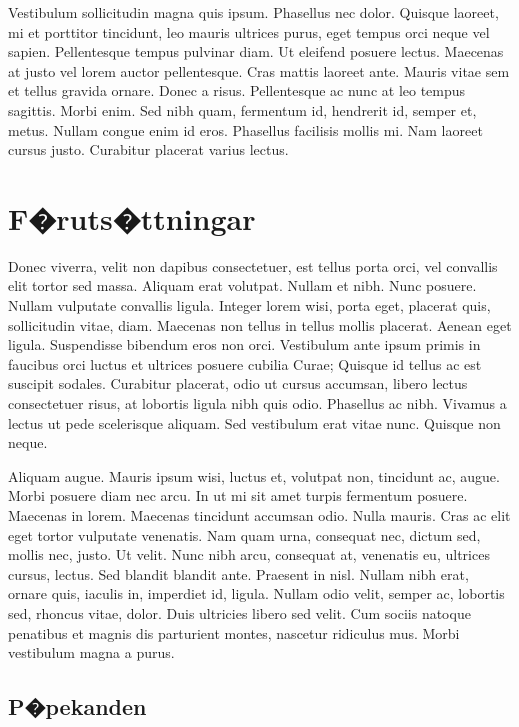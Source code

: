 \documentclass[a4paper,11pt]{kth-mag}
\begin{document}
Vestibulum sollicitudin magna quis ipsum. Phasellus nec dolor. Quisque
laoreet, mi et porttitor tincidunt, leo mauris ultrices purus, eget
tempus orci neque vel sapien. Pellentesque tempus pulvinar diam. Ut
eleifend posuere lectus. Maecenas at justo vel lorem auctor
pellentesque. Cras mattis laoreet ante. Mauris vitae sem et tellus
gravida ornare. Donec a risus. Pellentesque ac nunc at leo tempus
sagittis. Morbi enim. Sed nibh quam, fermentum id, hendrerit id,
semper et, metus. Nullam congue enim id eros. Phasellus facilisis
mollis mi. Nam laoreet cursus justo. Curabitur placerat varius lectus.

\section{F�ruts�ttningar}

Donec viverra, velit non dapibus consectetuer, est tellus porta orci,
vel convallis elit tortor sed massa. Aliquam erat volutpat. Nullam et
nibh. Nunc posuere. Nullam vulputate convallis ligula. Integer lorem
wisi, porta eget, placerat quis, sollicitudin vitae, diam. Maecenas
non tellus in tellus mollis placerat. Aenean eget ligula. Suspendisse
bibendum eros non orci. Vestibulum ante ipsum primis in faucibus orci
luctus et ultrices posuere cubilia Curae; Quisque id tellus ac est
suscipit sodales. Curabitur placerat, odio ut cursus accumsan, libero
lectus consectetuer risus, at lobortis ligula nibh quis odio.
Phasellus ac nibh. Vivamus a lectus ut pede scelerisque aliquam. Sed
vestibulum erat vitae nunc. Quisque non neque.

Aliquam augue. Mauris ipsum wisi, luctus et, volutpat non, tincidunt
ac, augue. Morbi posuere diam nec arcu. In ut mi sit amet turpis
fermentum posuere. Maecenas in lorem. Maecenas tincidunt accumsan
odio. Nulla mauris. Cras ac elit eget tortor vulputate venenatis. Nam
quam urna, consequat nec, dictum sed, mollis nec, justo. Ut velit.
Nunc nibh arcu, consequat at, venenatis eu, ultrices cursus, lectus.
Sed blandit blandit ante. Praesent in nisl. Nullam nibh erat, ornare
quis, iaculis in, imperdiet id, ligula. Nullam odio velit, semper ac,
lobortis sed, rhoncus vitae, dolor. Duis ultricies libero sed velit.
Cum sociis natoque penatibus et magnis dis parturient montes, nascetur
ridiculus mus. Morbi vestibulum magna a purus.

\subsection{P�pekanden}
\end{document}
